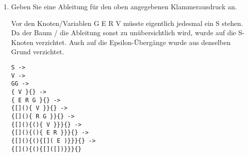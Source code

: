 \documentclass{lehramt-informatik-aufgabe}
\begin{document}
\begin{enumerate}
\begin{liAntwort}
\end{liAntwort}

\newpage

\item Geben Sie eine Ableitung für den oben angegebenen Klammerausdruck
an.

\begin{liAntwort}


Vor den Knoten/Variablen G E R V müsste eigentlich jedesmal ein S
stehen. Da der Baum / die Ableitung sonst zu unübersichtlich wird, wurde
auf die S-Knoten verzichtet. Auch auf die Epsilon-Übergänge wurde aus
denselben Grund verzichtet.

\begin{verbatim}
S ->
V ->
GG ->
{ V }{} ->
{ E R G }{} ->
{[](){ V }}{} ->
{[](){ R G }}{} ->
{[](){(){ V }}}{} ->
{[](){(){ E R }}}{} ->
{[](){(){[]( E )}}}{} ->
{[](){(){[]([])}}}{}
\end{verbatim}

\begin{center}
\end{center}
\end{liAntwort}

\end{enumerate}
\end{document}
